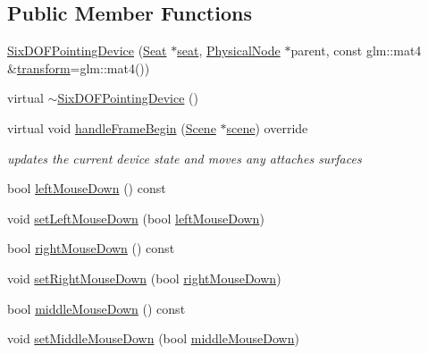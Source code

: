 \subsection*{Public Member Functions}
\begin{DoxyCompactItemize}
\item 
\hyperlink{classmotorcar_1_1SixDOFPointingDevice_a553ef70ad5a67e2f21a012a57c7fc398}{Six\-D\-O\-F\-Pointing\-Device} (\hyperlink{classmotorcar_1_1Seat}{Seat} $\ast$\hyperlink{classmotorcar_1_1SixDOFPointingDevice_a296fe215aeb4ae2e8724c877aabc874f}{seat}, \hyperlink{classmotorcar_1_1PhysicalNode}{Physical\-Node} $\ast$parent, const glm\-::mat4 \&\hyperlink{classmotorcar_1_1SceneGraphNode_ad96e79fdd739ac8223a3128003be391a}{transform}=glm\-::mat4())
\item 
virtual \hyperlink{classmotorcar_1_1SixDOFPointingDevice_a234bf04e5af6be0f832f0a425719273c}{$\sim$\-Six\-D\-O\-F\-Pointing\-Device} ()
\item 
virtual void \hyperlink{classmotorcar_1_1SixDOFPointingDevice_a70dad2fa3cc63cb6eac584ae2f632df6}{handle\-Frame\-Begin} (\hyperlink{classmotorcar_1_1Scene}{Scene} $\ast$\hyperlink{classmotorcar_1_1SceneGraphNode_aa14e637ed4ae98f77e28941a4b5cfdd8}{scene}) override
\begin{DoxyCompactList}\small\item\em updates the current device state and moves any attaches surfaces \end{DoxyCompactList}\item 
bool \hyperlink{classmotorcar_1_1SixDOFPointingDevice_a7d73caedee587fab53c19e4ee1617611}{left\-Mouse\-Down} () const 
\item 
void \hyperlink{classmotorcar_1_1SixDOFPointingDevice_a8f3f87d7e7f64991d3abb6e724ca25be}{set\-Left\-Mouse\-Down} (bool \hyperlink{classmotorcar_1_1SixDOFPointingDevice_a7d73caedee587fab53c19e4ee1617611}{left\-Mouse\-Down})
\item 
bool \hyperlink{classmotorcar_1_1SixDOFPointingDevice_a832aeb89ec4400f0c32c6ba355d5a3f4}{right\-Mouse\-Down} () const 
\item 
void \hyperlink{classmotorcar_1_1SixDOFPointingDevice_ac4cf201773bef4db5f57dedfbb8ca0c1}{set\-Right\-Mouse\-Down} (bool \hyperlink{classmotorcar_1_1SixDOFPointingDevice_a832aeb89ec4400f0c32c6ba355d5a3f4}{right\-Mouse\-Down})
\item 
bool \hyperlink{classmotorcar_1_1SixDOFPointingDevice_a85585b2c17d6457206616f0ac6e5479c}{middle\-Mouse\-Down} () const 
\item 
void \hyperlink{classmotorcar_1_1SixDOFPointingDevice_a3f5b831a8731fd60ce01e5066319f09f}{set\-Middle\-Mouse\-Down} (bool \hyperlink{classmotorcar_1_1SixDOFPointingDevice_a85585b2c17d6457206616f0ac6e5479c}{middle\-Mouse\-Down})

\end{DoxyCompactItemize}
